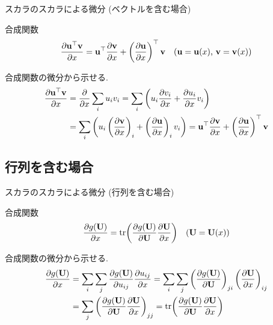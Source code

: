 \documentclass[dvipdfmx,notheorems,t]{beamer}
\begin{document}
\begin{frame}{スカラのスカラによる微分 (ベクトルを含む場合)}
\begin{block}{合成関数}
  \begin{align*}
    \pdv{\vb{u}^\top \vb{v}}{x} &= \vb{u}^\top \pdv{\vb{v}}{x}
      + \left( \pdv{\vb{u}}{x} \right)^\top \vb{v}
      & \text{($\vb{u} = \vb{u}(x)$, $\vb{v} = \vb{v}(x)$)}
  \end{align*}
\end{block}

合成関数の微分から示せる.
\begin{align*}
  \pdv{\vb{u}^\top \vb{v}}{x} &= \pdv{x} \sum_i u_i v_i
    = \sum_i \left( u_i \pdv{v_i}{x} + \pdv{u_i}{x} v_i \right) \\
    &= \sum_i \left( u_i \left( \pdv{\vb{v}}{x} \right)_i
      + \left( \pdv{\vb{u}}{x} \right)_i v_i \right)
    = \vb{u}^\top \pdv{\vb{v}}{x} + \left( \pdv{\vb{u}}{x} \right)^\top \vb{v}
\end{align*}
\end{frame}

\subsection{行列を含む場合}

\begin{frame}{スカラのスカラによる微分 (行列を含む場合)}
\begin{block}{合成関数}
  \begin{align*}
    \pdv{g(\vb{U})}{x} &= \tr(\pdv{g(\vb{U})}{\vb{U}} \pdv{\vb{U}}{x})
      & \text{($\vb{U} = \vb{U}(x)$)}
  \end{align*}
\end{block}

合成関数の微分から示せる.
\begin{align*}
  \pdv{g(\vb{U})}{x} &= \sum_i \sum_j \pdv{g(\vb{U})}{u_{ij}} \pdv{u_{ij}}{x}
    = \sum_i \sum_j \left( \pdv{g(\vb{U})}{\vb{U}} \right)_{ji} \left( \pdv{\vb{U}}{x} \right)_{ij} \\
    &= \sum_j \left( \pdv{g(\vb{U})}{\vb{U}} \pdv{\vb{U}}{x} \right)_{jj}
    = \tr(\pdv{g(\vb{U})}{\vb{U}} \pdv{\vb{U}}{x})
\end{align*}
\end{frame}
\end{document}
